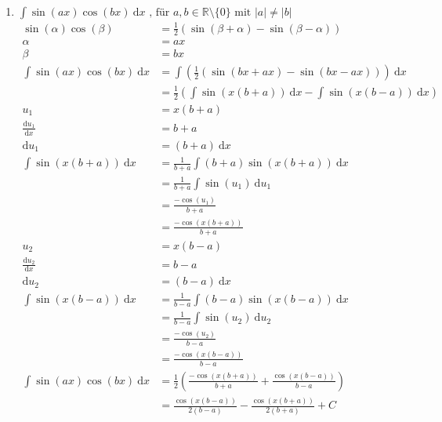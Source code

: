 \documentclass[10pt]{article}
\begin{document}
\begin{enumerate}[start=5,leftmargin=1in]
\begin{enumerate}
        \item $\int \sin(ax) \cos(bx) \: \text{d}x \text{ , für } a,b \in \mathbb{R} \setminus \{0\} \text{ mit } |a| \neq |b|$
        \begin{align*}
            \sin(\alpha) \cos(\beta) &= \frac{1}{2} (\sin(\beta + \alpha) - \sin(\beta - \alpha)) \\
            \alpha &= ax \\
            \beta &= bx \\
            \int \sin(ax) \cos(bx) \: \text{d}x &= \int \left(\frac{1}{2} (\sin(bx + ax) - \sin(bx - ax))\right) \: \text{d}x \\
            &= \frac{1}{2} \left( \int \sin(x(b+a)) \: \text{d}x - \int \sin(x(b-a)) \: \text{d}x \right) \\
            u_1 &= x(b+a) \\
            \frac{\text{d}u_1}{\text{d}x} &= b+a \\
            \text{d}u_1 &= (b+a) \: \text{d}x \\
            \int \sin(x(b+a)) \: \text{d}x &= \frac{1}{b+a} \int (b+a) \sin(x(b+a)) \: \text{d}x \\
            &= \frac{1}{b+a} \int \sin(u_1) \: \text{d}u_1 \\
            &= \frac{-\cos(u_1)}{b+a} \\
            &= \frac{-\cos(x(b+a))}{b+a} \\
            u_2 &= x(b-a) \\
            \frac{\text{d}u_2}{\text{d}x} &= b-a \\
            \text{d}u_2 &= (b-a) \: \text{d}x \\
            \int \sin(x(b-a)) \: \text{d}x &= \frac{1}{b-a} \int (b-a) \sin(x(b-a)) \: \text{d}x \\
            &= \frac{1}{b-a} \int \sin(u_2) \: \text{d}u_2 \\
            &= \frac{-\cos(u_2)}{b-a} \\
            &= \frac{-\cos(x(b-a))}{b-a} \\
            \int \sin(ax) \cos(bx) \: \text{d}x &= \frac{1}{2} \left(\frac{-\cos(x(b+a))}{b+a} + \frac{\cos(x(b-a))}{b-a}\right) \\
            &= \frac{\cos(x(b-a))}{2(b-a)} - \frac{\cos(x(b+a))}{2(b+a)} + C
        \end{align*}


\end{enumerate}
\end{enumerate}
\end{document}
